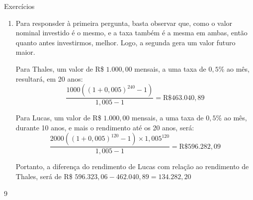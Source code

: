 \begin{answer}{Exercícios}
{\begin{enumerate}
    No banco B, investindo R\$ $100.000{,}00$ durante 1 ano, à taxa prefixada de $10$\% ao ano, o rendimento ao final desse ano será: R\$ $100.00\times1{,}1=110.000{,}00$, deste valor é descontado $17{,}5$\% de imposto sobre o rendimento, ou seja, é descontado $(0{,}175\times12.000)=2.100$), logo, o rendimento no bando A é $112.000-2.100=$R\$ $108.250{,}00$.

    A conclusão é que, do ponto de vista exclusivamente financeiro, a opç~~ao melhor seria investir no banco A, pois é o banco com maior rendimento de R\$ $100.000{,}00$ ao final de 1 ano. A sua opinião sobre a escolha da maioria das pessoal é pessoal.

    \item Para responsder à primeira pergunta, basta observar que, como o valor nominal investido é o mesmo, e a taxa também é a mesma em ambas, então quanto antes investirmos, melhor. Logo, a segunda gera um valor futuro maior.

    Para Thales, um valor de R\$ $1.000{,}00$ mensais, a uma taxa de $0{,}5$\% ao mês, resultará, em 20 anos:
    \begin{equation*}
    \frac{1000((1+0{,}005)^{240}-1)}{1{,}005-1}=\text{R\$ }463.040{,}89
    \end{equation*}

    Para Lucas, um valor de R\$ $1.000{,}00$ mensais, a uma taxa de $0{,}5$\% ao mês, durante 10 anos, e mais o rendimento até os 20 anos, será:
    \begin{equation*}
    \frac{2000((1+0{,}005)^{120}-1)\times1{,}005^{120}}{1{,}005-1}=\text{R\$ }596.282{,}09
    \end{equation*}

    Portanto, a diferença do rendimento de Lucas com relação ao rendimento de Thales, será de R\$ $596.323{,}06-462.040{,}89=134.282{,}20$
  \end{enumerate}
}{9}
\end{answer}
\clearmargin

